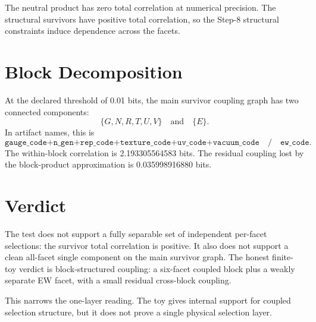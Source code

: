 \documentclass[11pt]{article}
\begin{document}
The neutral product has zero total correlation at numerical precision. The structural survivors have positive total correlation, so the Step-8 structural constraints induce dependence across the facets.

\section*{Block Decomposition}

At the declared threshold of 0.01 bits, the main survivor coupling graph has two connected components:
\[
\{G,N,R,T,U,V\} \quad \text{and} \quad \{E\}.
\]
In artifact names, this is
\[
\texttt{gauge\_code+n\_gen+rep\_code+texture\_code+uv\_code+vacuum\_code}
\quad / \quad
\texttt{ew\_code}.
\]
The within-block correlation is 2.193305564583 bits. The residual coupling lost by the block-product approximation is 0.035998916880 bits.

\section*{Verdict}

The test does not support a fully separable set of independent per-facet selections: the survivor total correlation is positive. It also does not support a clean all-facet single component on the main survivor graph. The honest finite-toy verdict is block-structured coupling: a six-facet coupled block plus a weakly separate EW facet, with a small residual cross-block coupling.

This narrows the one-layer reading. The toy gives internal support for coupled selection structure, but it does not prove a single physical selection layer.
\end{document}
